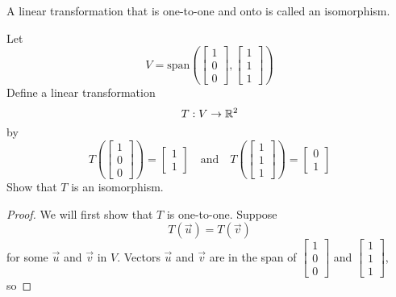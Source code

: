 \documentclass{ximera}
\begin{document}
\begin{definition} A linear transformation that is one-to-one and onto is called an isomorphism.
\end{definition}

\begin{example}\label{ex:subtosub} Let $$V=\text{span}\left(\begin{bmatrix}1\\0\\0\end{bmatrix}, \begin{bmatrix}1\\1\\1\end{bmatrix}\right)$$
Define a linear transformation $$T:V\rightarrow \mathbb{R}^2$$
by $$T\left(\begin{bmatrix}1\\0\\0\end{bmatrix}\right)=\begin{bmatrix}1\\1\end{bmatrix}\quad \text{and} \quad T\left(\begin{bmatrix}1\\1\\1\end{bmatrix}\right)=\begin{bmatrix}0\\1\end{bmatrix}$$
Show that $T$ is an isomorphism.
\begin{proof}

We will first show that $T$ is one-to-one.  
Suppose 
$$T(\vec{u})=T(\vec{v})$$
for some $\vec{u}$ and $\vec{v}$ in $V$. Vectors $\vec{u}$ and $\vec{v}$ are in the span of $\begin{bmatrix}1\\0\\0\end{bmatrix}$ and $\begin{bmatrix}1\\1\\1\end{bmatrix}$, so


\end{proof}
\end{example}
\end{document}
